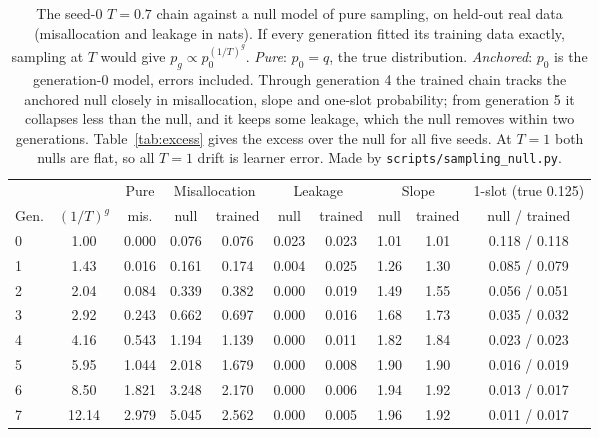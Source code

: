 \documentclass[10pt,letterpaper]{article}
\begin{document}
\begin{table}[H]
\centering
\caption{ The seed-0 $T{=}0.7$ chain against a null model of pure sampling, on held-out real data (misallocation and leakage in nats). If every generation fitted its training data exactly, sampling at $T$ would give $p_g \propto p_0^{(1/T)^g}$. \emph{Pure}: $p_0{=}q$, the true distribution. \emph{Anchored}: $p_0$ is the generation-0 model, errors included. Through generation 4 the trained chain tracks the anchored null closely in misallocation, slope and one-slot probability; from generation 5 it collapses less than the null, and it keeps some leakage, which the null removes within two generations. Table~\ref{tab:excess} gives the excess over the null for all five seeds. At $T{=}1$ both nulls are flat, so all $T{=}1$ drift is learner error. Made by \texttt{scripts/sampling\_null.py}.}
\small
\begin{tabular}{@{}lccccccccc@{}}
\toprule
& & Pure & \multicolumn{2}{c}{Misallocation} & \multicolumn{2}{c}{Leakage} & \multicolumn{2}{c}{Slope} & 1-slot (true 0.125) \\
\cmidrule(lr){3-3}\cmidrule(lr){4-5}\cmidrule(lr){6-7}\cmidrule(lr){8-9}\cmidrule(lr){10-10}
Gen. & $(1/T)^g$ & mis. & null & trained & null & trained & null & trained & null / trained \\
\midrule
0 & 1.00 & 0.000 & 0.076 & 0.076 & 0.023 & 0.023 & 1.01 & 1.01 & 0.118 / 0.118 \\
1 & 1.43 & 0.016 & 0.161 & 0.174 & 0.004 & 0.025 & 1.26 & 1.30 & 0.085 / 0.079 \\
2 & 2.04 & 0.084 & 0.339 & 0.382 & 0.000 & 0.019 & 1.49 & 1.55 & 0.056 / 0.051 \\
3 & 2.92 & 0.243 & 0.662 & 0.697 & 0.000 & 0.016 & 1.68 & 1.73 & 0.035 / 0.032 \\
4 & 4.16 & 0.543 & 1.194 & 1.139 & 0.000 & 0.011 & 1.82 & 1.84 & 0.023 / 0.023 \\
5 & 5.95 & 1.044 & 2.018 & 1.679 & 0.000 & 0.008 & 1.90 & 1.90 & 0.016 / 0.019 \\
6 & 8.50 & 1.821 & 3.248 & 2.170 & 0.000 & 0.006 & 1.94 & 1.92 & 0.013 / 0.017 \\
7 & 12.14 & 2.979 & 5.045 & 2.562 & 0.000 & 0.005 & 1.96 & 1.92 & 0.011 / 0.017 \\
\bottomrule
\end{tabular}
\label{tab:null}
\end{table}
\end{document}
